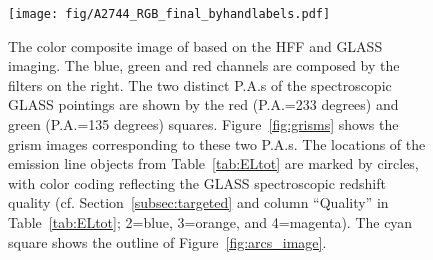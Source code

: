 \begin{figure}
    \centering
    \texttt{[image: fig/A2744\_RGB\_final\_byhandlabels.pdf]}
    \caption[The color composite image of \cler based on the HFF and GLASS imaging.]{The color composite image of \cler based on the HFF and GLASS imaging. The blue, green and red channels are composed by 
the filters on the right. The two distinct P.A.s of the spectroscopic GLASS pointings are shown by the red (P.A.=233 degrees) and 
green (P.A.=135 degrees) squares. Figure~\ref{fig:grisms} shows the grism images corresponding to these two P.A.s. The locations 
of the emission line objects from Table~\ref{tab:ELtot} are marked by circles, with color coding reflecting the GLASS 
spectroscopic redshift quality (cf. Section~\ref{subsec:targeted} and column ``Quality'' in Table~\ref{tab:ELtot}; 2=blue, 
3=orange, and 4=magenta). The cyan square shows the outline of Figure~\ref{fig:arcs_image}.}
\label{fig:image}
\end{figure}

